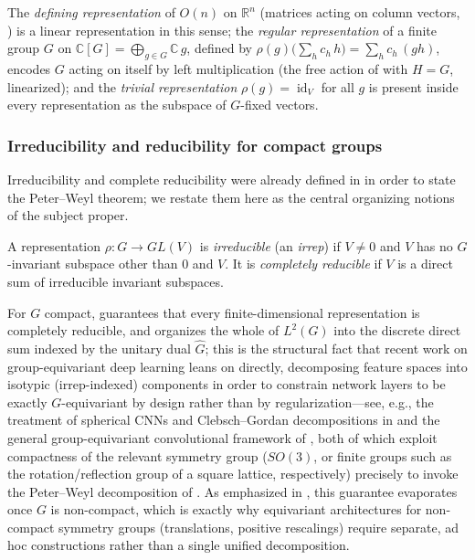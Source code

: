 \documentclass[mathematics,review,submit,moreauthors]{Definitions/mdpi}
\begin{document}
\begin{Example}
\label{ex:representations-recap}
The \emph{defining representation} of $O(n)$ on $\mathbb{R}^n$ (matrices
acting on column vectors, ) is a linear
representation in this sense; the \emph{regular representation} of a finite
group $G$ on $\mathbb{C}[G] = \bigoplus_{g \in G} \mathbb{C}\, g$, defined by
$\rho(g)\bigl(\sum_h c_h\, h\bigr) = \sum_h c_h\,(gh)$, encodes $G$ acting on
itself by left multiplication (the free action of
 with $H = G$, linearized); and the
\emph{trivial representation} $\rho(g) = \operatorname{id}_V$ for all $g$ is
present inside every representation as the subspace of $G$-fixed vectors.
\end{Example}

\subsubsection{Irreducibility and reducibility for compact groups}
\label{subsubsec:irreps-recap}

Irreducibility and complete reducibility were already defined in
 in order to state the Peter--Weyl theorem; we
restate them here as the central organizing notions of the subject proper.

\begin{Definition}
\label{def:irrep}
A representation $\rho : G \to GL(V)$ is \emph{irreducible} (an
\emph{irrep}) if $V \neq 0$ and $V$ has no $G$-invariant subspace other than
$0$ and $V$. It is \emph{completely reducible} if $V$ is a direct sum of
irreducible invariant subspaces.
\end{Definition}

For $G$ compact,  guarantees that every
finite-dimensional representation is completely reducible, and organizes the
whole of $L^2(G)$ into the discrete direct sum indexed by the unitary dual
$\widehat{G}$; this is the structural fact that recent work on
group-equivariant deep learning leans on directly, decomposing feature
spaces into isotypic (irrep-indexed) components in order to constrain
network layers to be exactly $G$-equivariant by design rather than by
regularization---see, e.g., the treatment of spherical CNNs and Clebsch--Gordan
decompositions in \citep{kondor2018p3icml} and the general group-equivariant
convolutional framework of \citep{cohen2014}, both of which exploit
compactness of the relevant symmetry group ($SO(3)$, or finite groups such as
the rotation/reflection group of a square lattice, respectively) precisely
to invoke the Peter--Weyl decomposition of . As
emphasized in , this guarantee
evaporates once $G$ is non-compact, which is exactly why equivariant
architectures for non-compact symmetry groups (translations, positive
rescalings) require separate, ad hoc constructions rather than a single
unified decomposition.
\end{document}
